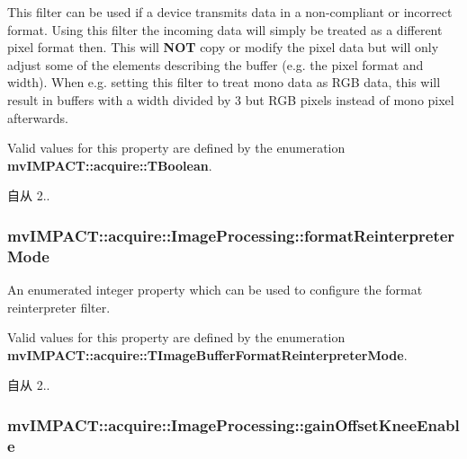This filter can be used if a device transmits data in a non-\/compliant or incorrect format. Using this filter the incoming data will simply be treated as a different pixel format then. This will {\bfseries N\+O\+T} copy or modify the pixel data but will only adjust some of the elements describing the buffer (e.\+g. the pixel format and width). When e.\+g. setting this filter to treat mono data as R\+G\+B data, this will result in buffers with a width divided by 3 but R\+G\+B pixels instead of mono pixel afterwards.

Valid values for this property are defined by the enumeration {\bfseries mv\+I\+M\+P\+A\+C\+T\+::acquire\+::\+T\+Boolean}.

\begin{DoxySince}{自从}
2.. 
\end{DoxySince}
\hypertarget{classmv_i_m_p_a_c_t_1_1acquire_1_1_image_processing_a9077d1d9e51681a0ae60e9265f5129a8}{
\subsubsection[{format\+Reinterpreter\+Mode}]{ mv\+I\+M\+P\+A\+C\+T\+::acquire\+::\+Image\+Processing\+::format\+Reinterpreter\+Mode}}\label{classmv_i_m_p_a_c_t_1_1acquire_1_1_image_processing_a9077d1d9e51681a0ae60e9265f5129a8}


An enumerated integer property which can be used to configure the format reinterpreter filter. 

Valid values for this property are defined by the enumeration {\bfseries mv\+I\+M\+P\+A\+C\+T\+::acquire\+::\+T\+Image\+Buffer\+Format\+Reinterpreter\+Mode}.

\begin{DoxySince}{自从}
2.. 
\end{DoxySince}
\hypertarget{classmv_i_m_p_a_c_t_1_1acquire_1_1_image_processing_abe7ed4cb142288de179ce4e86b314ad6}{
\subsubsection[{gain\+Offset\+Knee\+Enable}]{ mv\+I\+M\+P\+A\+C\+T\+::acquire\+::\+Image\+Processing\+::gain\+Offset\+Knee\+Enable}}\label{classmv_i_m_p_a_c_t_1_1acquire_1_1_image_processing_abe7ed4cb142288de179ce4e86b314ad6}


